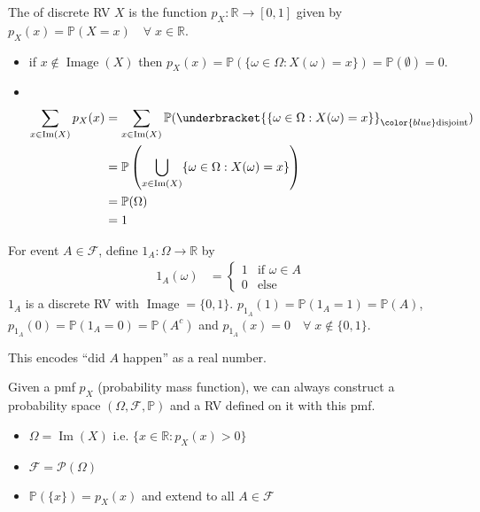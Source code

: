 \begin{definition}
    The  of discrete RV $X$ is the function $p_X : \mathbb{R} \to [0, 1]$ given by $p_X(x) = \mathbb{P}(X = x) \quad \forall \; x \in \mathbb{R}$.
\end{definition} 

\begin{note} \mbox{}
    \begin{itemize}
        \item if $x \notin \operatorname{Image}(X)$ then $p_X(x) = \mathbb{P}(\{\omega \in \Omega : X(\omega) = x\}) = \mathbb{P}(\emptyset) = 0$.
        \item ~\vspace*{-1.5\baselineskip}
        \begin{align*}
            \sum_{x \in \operatorname{Im}(X)} p_X(x) &= \sum_{x \in \operatorname{Im}(X)} \mathbb{P}(\underbracket{\{\omega \in \Omega : X(\omega) = x\}}_{\color{blue} \text{disjoint}}) \\
            &= \mathbb{P}\left(\bigcup_{x \in \operatorname{Im}(X)} \{\omega \in \Omega : X(\omega) = x\} \right) \\
            &= \mathbb{P}(\Omega) \\
            &= 1
        \end{align*} 
    \end{itemize} 
\end{note} 
 
\begin{example}
    For event $A \in \mathcal{F}$, define $1_A : \Omega \to \mathbb{R}$ by 
    \begin{align*}
        1_A(\omega) &= \begin{cases}
            1 & \text{if } \omega \in A \\
            0 & \text{else }
        \end{cases}  
    \end{align*} 
    $1_A$ is a discrete RV with $\operatorname{Image} = \{0, 1\}$.
    $p_{1_A}(1) = \mathbb{P}(1_A = 1) = \mathbb{P}(A)$, $p_{1_A}(0) = \mathbb{P}(1_A = 0) = \mathbb{P}(A^c)$ and $p_{1_A}(x) = 0 \quad \forall \; x \notin \{0, 1\}$.

    \color{blue} This encodes ``did $A$ happen'' as a real number.
\end{example} 

\begin{remark}
    Given a pmf $p_X$ (probability mass function), we can always construct a probability space $(\Omega, \mathcal{F}, \mathbb{P})$ and a RV defined on it with this pmf.

    \color{blue}
    \begin{itemize}
        \item $\Omega = \operatorname{Im}(X)$ i.e. $\{x \in \mathbb{R} : p_X(x) > 0\}$
        \item $\mathcal{F} = \mathcal{P}(\Omega)$
        \item $\mathbb{P}(\{x\}) = p_X(x)$ and extend to all $A \in \mathcal{F}$
    \end{itemize} 
\end{remark} 

